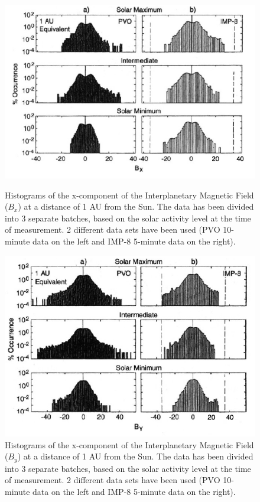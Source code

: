 \documentclass[11pt]{article}
\begin{document}
        \begin{figure}[t!]
            \begin{minipage}{0.48\textwidth}
                \centering
                \includegraphics[width=\textwidth]{fig_introduction/russellBX.png}
                \caption{Histograms of the x-component of the Interplanetary Magnetic Field ($B_x$) at a distance of 1 AU from the Sun\cite{2001russell}. The data has been divided into 3 separate batches, based on the solar activity level at the time of measurement. 2 different data sets have been used (PVO 10-minute data on the left and IMP-8 5-minute data on the right).}
                \label{fig:russellBX}
            \end{minipage}
            \hfill
            \begin{minipage}{0.48\textwidth}
                \centering
                \includegraphics[width=\textwidth]{fig_introduction/russellBY.png}
                \caption{Histograms of the x-component of the Interplanetary Magnetic Field ($B_y$) at a distance of 1 AU from the Sun\cite{2001russell}. The data has been divided into 3 separate batches, based on the solar activity level at the time of measurement. 2 different data sets have been used (PVO 10-minute data on the left and IMP-8 5-minute data on the right).}
                \label{fig:russellBY}
            \end{minipage}
        \end{figure}
\end{document}
